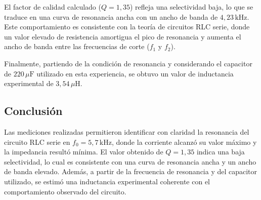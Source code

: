 El factor de calidad calculado (\(Q = 1{,}35\)) refleja una selectividad baja, lo que se traduce en una curva de resonancia ancha con un ancho de banda de \(4{,}23\,\text{kHz}\). Este comportamiento es consistente con la teoría de circuitos RLC serie, donde un valor elevado de resistencia amortigua el pico de resonancia y aumenta el ancho de banda entre las frecuencias de corte (\(f_1\) y \(f_2\)).

Finalmente, partiendo de la condición de resonancia y considerando el capacitor de \(220\,\mu\text{F}\) utilizado en esta experiencia, se obtuvo un valor de inductancia experimental de \(3{,}54\,\mu\text{H}\).

\subsection{Conclusión}

Las mediciones realizadas permitieron identificar con claridad la resonancia del circuito RLC serie en \(f_0 = 5{,}7\,\text{kHz}\), donde la corriente alcanzó su valor máximo y la impedancia resultó mínima. El valor obtenido de \(Q = 1{,}35\) indica una baja selectividad, lo cual es consistente con una curva de resonancia ancha y un ancho de banda elevado. Además, a partir de la frecuencia de resonancia y del capacitor utilizado, se estimó una inductancia experimental coherente con el comportamiento observado del circuito.

\newpage
